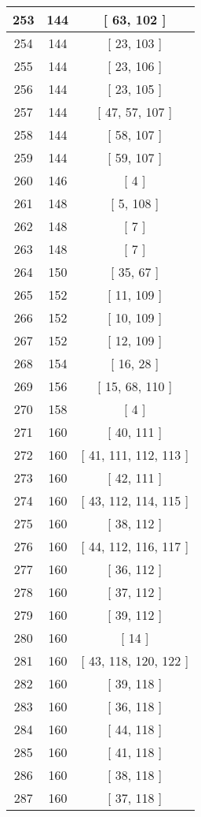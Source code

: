 \begin{center}
\begin{longtable}[H]{|| c c c ||}
\hline
253 & 144 & [ 63, 102 ] \\ 
\hline
254 & 144 & [ 23, 103 ] \\ 
\hline
255 & 144 & [ 23, 106 ] \\ 
\hline
256 & 144 & [ 23, 105 ] \\ 
\hline
257 & 144 & [ 47, 57, 107 ] \\ 
\hline
258 & 144 & [ 58, 107 ] \\ 
\hline
259 & 144 & [ 59, 107 ] \\ 
\hline
260 & 146 & [ 4 ] \\ 
\hline
261 & 148 & [ 5, 108 ] \\ 
\hline
262 & 148 & [ 7 ] \\ 
\hline
263 & 148 & [ 7 ] \\ 
\hline
264 & 150 & [ 35, 67 ] \\ 
\hline
265 & 152 & [ 11, 109 ] \\ 
\hline
266 & 152 & [ 10, 109 ] \\ 
\hline
267 & 152 & [ 12, 109 ] \\ 
\hline
268 & 154 & [ 16, 28 ] \\ 
\hline
269 & 156 & [ 15, 68, 110 ] \\ 
\hline
270 & 158 & [ 4 ] \\ 
\hline
271 & 160 & [ 40, 111 ] \\ 
\hline
272 & 160 & [ 41, 111, 112, 113 ] \\ 
\hline
273 & 160 & [ 42, 111 ] \\ 
\hline
274 & 160 & [ 43, 112, 114, 115 ] \\ 
\hline
275 & 160 & [ 38, 112 ] \\ 
\hline
276 & 160 & [ 44, 112, 116, 117 ] \\ 
\hline
277 & 160 & [ 36, 112 ] \\ 
\hline
278 & 160 & [ 37, 112 ] \\ 
\hline
279 & 160 & [ 39, 112 ] \\ 
\hline
280 & 160 & [ 14 ] \\ 
\hline
281 & 160 & [ 43, 118, 120, 122 ] \\ 
\hline
282 & 160 & [ 39, 118 ] \\ 
\hline
283 & 160 & [ 36, 118 ] \\ 
\hline
284 & 160 & [ 44, 118 ] \\ 
\hline
285 & 160 & [ 41, 118 ] \\ 
\hline
286 & 160 & [ 38, 118 ] \\ 
\hline
287 & 160 & [ 37, 118 ] \\ 

\end{longtable}
\end{center}
